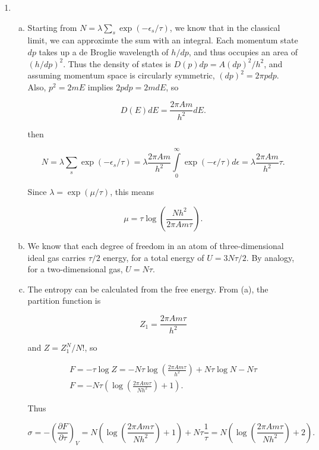 \documentclass{article}
\begin{document}
\begin{enumerate}
\begin{enumerate}[(a)]
	\end{enumerate}

	\item

	\begin{enumerate}[(a)]

		\item

		Starting from $N = \lambda \sum_s \exp(-\epsilon_s / \tau)$, we know that in the classical limit, we can approximte the sum with an integral. Each momentum state $dp$ takes up a de Broglie wavelength of $h / dp$, and thus occupies an area of $ (h / dp)^2.$ Thus the density of states is $D(p) dp = A (dp)^2 / h^2$, and assuming momentum space is circularly symmetric, $(dp)^2 = 2 \pi p dp$. Also, $p^2 = 2m E$ implies $2p dp = 2m dE$, so

		$$D(E)dE = \frac{2 \pi A m}{h^2} dE.$$

		then

		$$N = \lambda  \sum_s \exp(-\epsilon_s / \tau) = \lambda \frac{2 \pi A m}{h^2} \int \limits_0^\infty \exp(-\epsilon/\tau) d\epsilon = \lambda \frac{2 \pi A m}{h^2} \tau.$$

		Since $\lambda = \exp(\mu / \tau)$, this means

		$$\mu = \tau \log \left( \frac{N h^2}{2 \pi A m \tau}\right).$$

		\item

		We know that each degree of freedom in an atom of three-dimensional ideal gas carries $\tau / 2$ energy, for a total energy of $U = 3N \tau/2$. By analogy, for a two-dimensional gas, $U = N \tau.$

		\item

		The entropy can be calculated from the free energy. From (a), the partition function is

		$$Z_1 = \frac{2\pi A m \tau}{h^2}$$

		and $Z = Z_1^N / N!$, so

		\begin{gather*}
		F = - \tau \log Z = -N \tau \log \left( \frac{2\pi A m \tau}{h^2} \right) + N \tau \log N - N \tau \\
		F = -N\tau \left( \log \left( \frac{2\pi A m \tau}{N h^2} \right) + 1 \right).
		\end{gather*}

		Thus 

		$$\sigma = - \left( \frac{\partial F}{\partial \tau} \right)_V = N \left(  \log \left( \frac{2\pi A m \tau}{N h^2} \right) + 1 \right) + N\tau \frac{1}{\tau} =  N \left(  \log \left( \frac{2\pi A m \tau}{N h^2} \right) + 2 \right).$$


\end{enumerate}
\end{enumerate}
\end{document}
